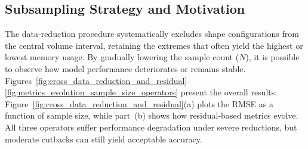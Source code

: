 \subsection{Subsampling Strategy and Motivation}
\label{subsec:data-reduction-strategy-and-motivation}

The data-reduction procedure systematically excludes shape configurations from the central volume interval, retaining the extremes that often yield the highest or lowest memory usage.
By gradually lowering the sample count (\(N\)), it is possible to observe how model performance deteriorates or remains stable.
Figures~\ref{fig:cross_data_reduction_and_residual}--\ref{fig:metrics_evolution_sample_size_operators} present the overall results.
Figure~\ref{fig:cross_data_reduction_and_residual}(a) plots the \ac{RMSE} as a function of sample size, while part~(b) shows how residual-based metrics evolve.
All three operators suffer performance degradation under severe reductions, but moderate cutbacks can still yield acceptable accuracy.

